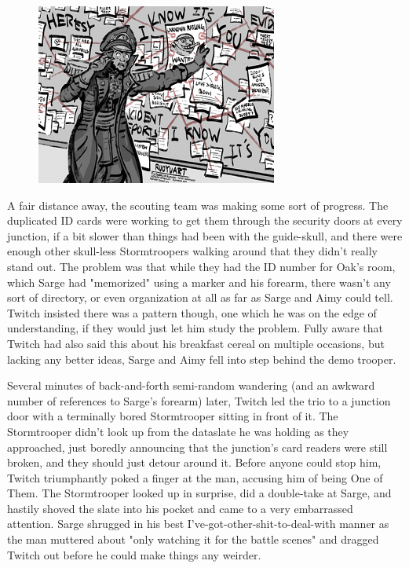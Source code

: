 \begin{figure}
	\begin{center}
		\includegraphics[width=\figwidth]{pics/21/78.png}
	\end{center}
\end{figure}
A fair distance away, the scouting team was making some sort of progress. 
The duplicated ID cards were working to get them through the security doors at every junction, if a bit slower than things had been with the guide-skull, and there were enough other skull-less Stormtroopers walking around that they didn't really stand out. 
The problem was that while they had the ID number for Oak's room, which Sarge had "memorized" using a marker and his forearm, there wasn't any sort of directory, or even organization at all as far as Sarge and Aimy could tell. 
Twitch insisted there was a pattern though, one which he was on the edge of understanding, if they would just let him study the problem. 
Fully aware that Twitch had also said this about his breakfast cereal on multiple occasions, but lacking any better ideas, Sarge and Aimy fell into step behind the demo trooper.

Several minutes of back-and-forth semi-random wandering (and an awkward number of references to Sarge's forearm) later, Twitch led the trio to a junction door with a terminally bored Stormtrooper sitting in front of it. 
The Stormtrooper didn't look up from the dataslate he was holding as they approached, just boredly announcing that the junction's card readers were still broken, and they should just detour around it. 
Before anyone could stop him, Twitch triumphantly poked a finger at the man, accusing him of being One of Them. 
The Stormtrooper looked up in surprise, did a double-take at Sarge, and hastily shoved the slate into his pocket and came to a very embarrassed attention. 
Sarge shrugged in his best I've-got-other-shit-to-deal-with manner as the man muttered about "only watching it for the battle scenes" and dragged Twitch out before he could make things any weirder.

